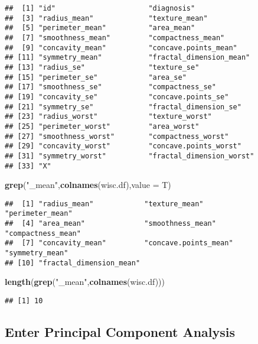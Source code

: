 \documentclass[
]{article}
\newenvironment{Shaded}{\begin{snugshade}}{\end{snugshade}}
\newcommand{\DataTypeTok}[1]{\textcolor[rgb]{0.13,0.29,0.53}{#1}}
\newcommand{\KeywordTok}[1]{\textcolor[rgb]{0.13,0.29,0.53}{\textbf{#1}}}
\newcommand{\NormalTok}[1]{#1}
\newcommand{\StringTok}[1]{\textcolor[rgb]{0.31,0.60,0.02}{#1}}
\begin{document}
\begin{verbatim}
##  [1] "id"                      "diagnosis"              
##  [3] "radius_mean"             "texture_mean"           
##  [5] "perimeter_mean"          "area_mean"              
##  [7] "smoothness_mean"         "compactness_mean"       
##  [9] "concavity_mean"          "concave.points_mean"    
## [11] "symmetry_mean"           "fractal_dimension_mean" 
## [13] "radius_se"               "texture_se"             
## [15] "perimeter_se"            "area_se"                
## [17] "smoothness_se"           "compactness_se"         
## [19] "concavity_se"            "concave.points_se"      
## [21] "symmetry_se"             "fractal_dimension_se"   
## [23] "radius_worst"            "texture_worst"          
## [25] "perimeter_worst"         "area_worst"             
## [27] "smoothness_worst"        "compactness_worst"      
## [29] "concavity_worst"         "concave.points_worst"   
## [31] "symmetry_worst"          "fractal_dimension_worst"
## [33] "X"
\end{verbatim}

\begin{Shaded}
\begin{Highlighting}[]
\KeywordTok{grep}\NormalTok{(}\StringTok{"_mean"}\NormalTok{,}\KeywordTok{colnames}\NormalTok{(wisc.df),}\DataTypeTok{value =}\NormalTok{ T)}
\end{Highlighting}
\end{Shaded}

\begin{verbatim}
##  [1] "radius_mean"            "texture_mean"           "perimeter_mean"        
##  [4] "area_mean"              "smoothness_mean"        "compactness_mean"      
##  [7] "concavity_mean"         "concave.points_mean"    "symmetry_mean"         
## [10] "fractal_dimension_mean"
\end{verbatim}

\begin{Shaded}
\begin{Highlighting}[]
\KeywordTok{length}\NormalTok{(}\KeywordTok{grep}\NormalTok{(}\StringTok{"_mean"}\NormalTok{,}\KeywordTok{colnames}\NormalTok{(wisc.df)))}
\end{Highlighting}
\end{Shaded}

\begin{verbatim}
## [1] 10
\end{verbatim}

\hypertarget{enter-principal-component-analysis}{%
\subsection{Enter Principal Component
Analysis}\label{enter-principal-component-analysis}}
\end{document}
